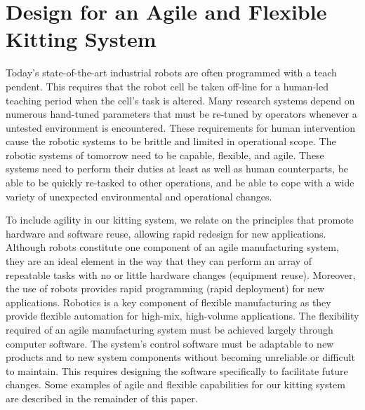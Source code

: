 \documentclass[final,3p,12pt]{elsarticle}
\begin{document}



\section{Design for an Agile and Flexible Kitting System}
\label{Sect:design}

Today's state-of-the-art industrial robots are often programmed with a teach pendent. This requires that the robot cell be taken off-line for a human-led teaching period when the cell's task is altered.  Many research systems depend on numerous hand-tuned parameters that must be re-tuned by operators whenever a untested environment is encountered. These requirements for human intervention cause the robotic systems to be brittle and limited in operational scope. The robotic systems of tomorrow need to be capable, flexible, and agile.  These systems need to perform their duties at least as well as human counterparts, be able to be quickly re-tasked to other operations, and be able to cope with a wide variety of unexpected environmental and operational changes.

To include agility in our kitting system, we relate on the principles that promote hardware and software reuse, allowing rapid redesign for new applications. Although robots constitute one component of an agile manufacturing system, they are an ideal element in the way that they can perform an array of repeatable tasks with no or little hardware changes (equipment reuse). Moreover, the use of robots provides rapid programming (rapid deployment) for new applications. Robotics is a key component of flexible manufacturing as they provide flexible automation for high-mix, high-volume applications. The flexibility required of an agile manufacturing system must be achieved largely through computer software. The system's control software must be adaptable to new products and to new system components without becoming unreliable or difficult to maintain. This requires designing the software specifically to facilitate future changes. Some examples of agile and flexible capabilities for our kitting system are described in the remainder of this paper.
\end{document}
